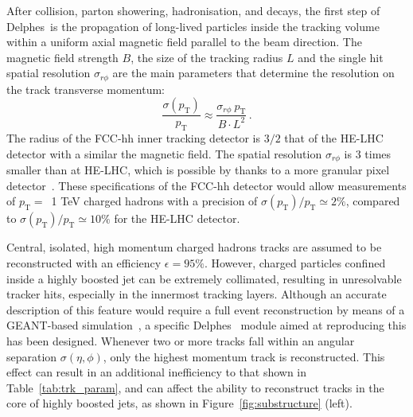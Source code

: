 \documentclass[a4paper,11pt]{article}
\newcommand{\pt}{\ensuremath{p_{\text{T}}}}
\newcommand{\delphes}{{\sc Delphes}}
\begin{document}
After collision, parton showering, hadronisation, and decays, the first step of \delphes{}~is the propagation of long-lived particles inside the tracking volume within a uniform axial magnetic field parallel to the beam direction. The magnetic field strength $B$, the size of the tracking radius $L$ and the single hit spatial resolution $\sigma_{r\phi}$ are the main parameters that determine the resolution on the track transverse momentum:
\begin{equation}
\frac{\sigma(\pt)}{\pt} \approx \frac{\sigma_{r\phi}~ \pt}{B\cdot L^2}\,.
\end{equation}
The radius of the FCC-hh inner tracking detector is $3/2$ that of the HE-LHC detector with a similar the magnetic field.  The spatial resolution $\sigma_{r\phi}$ is 3 times smaller than at HE-LHC, which is possible by thanks to a more granular pixel detector~\cite{CMS:2012sda}. These specifications of the FCC-hh detector would allow measurements of $\pt=$~1 TeV charged hadrons with a precision of $\sigma(\pt)/\pt  \simeq 2\%$, compared to $\sigma(\pt)/\pt \simeq 10\%$ for the HE-LHC detector. 

Central, isolated, high momentum charged hadrons tracks are assumed to be reconstructed with an efficiency $\epsilon = 95\%$. However, charged particles confined inside a highly boosted jet can be extremely collimated, resulting in unresolvable tracker hits, especially in the innermost tracking layers. Although an accurate description of this feature would require a full event reconstruction by means of a GEANT-based simulation~\cite{Agostinelli:2002hh}, a specific \delphes{}~ module aimed at reproducing this has been designed. Whenever two or more tracks fall within an angular separation $\sigma(\eta,\phi)$, only the highest momentum track is reconstructed. This effect can result in an additional inefficiency to that shown in Table~\ref{tab:trk_param}, and can affect the ability to reconstruct tracks in the core of highly boosted jets, as shown in Figure~\ref{fig:substructure} (left).
\end{document}
